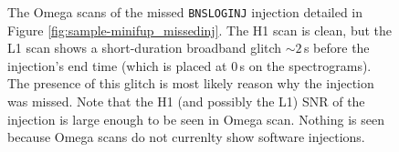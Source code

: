 \begin{figure}[p]
\center
{}
\label{fig:sample-omega_missedinj}
\caption{The Omega scans of the missed \texttt{BNSLOGINJ} injection detailed in
Figure \ref{fig:sample-minifup_missedinj}. The H1 scan is clean, but the L1
scan shows a short-duration broadband glitch $\sim2\,$s before the injection's
end time (which is placed at $0\,$s on the spectrograms). The presence of this
glitch is most likely reason why the injection was missed. Note that the H1
(and possibly the L1) \ac{SNR} of the injection is large enough to be seen in
Omega scan. Nothing is seen because Omega scans do not currenlty show software
injections.}
\end{figure}

